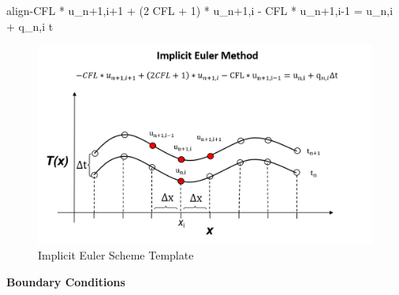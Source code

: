 \documentclass[10pt, letter, showtrims]{extarticle}
\newcommand{\boxedeq}[2]{\begin{empheq}[box={\fboxsep=6pt\fbox}]{align}\label{#1}#2\end{empheq}}
\begin{document}
%		
%		
%		
%		
%		
		
		\boxedeq{eq:implicit2}{-CFL * u_{n+1,i+1} + (2 CFL + 1) * u_{n+1,i} - CFL * u_{n+1,i-1} = u_{n,i} + q_{n,i} \Delta t}
		
		\FloatBarrier
		\begin{figure}[h]
			\centering
			\captionsetup{justification=centering}
			\includegraphics[width=0.65\linewidth]{"Figures/Implicit_Euler_Method"}
			\caption{Implicit Euler Scheme Template}
			\label{fig:implicit}
		\end{figure}
		\FloatBarrier
		
		\pagebreak
		
		\noindent
		\textbf{Boundary Conditions} \\
		
\end{document}
